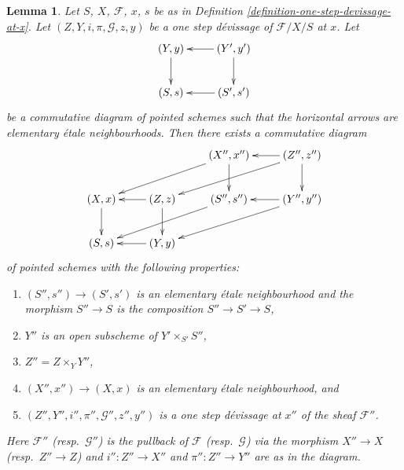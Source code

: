 \documentclass[10pt,a4paper]{amsart}
\theoremstyle{plain}
\newtheorem{lemma}[subsection]{Lemma}
\theoremstyle{definition}
\theoremstyle{remark}
\numberwithin{equation}{subsection}
\begin{document}
\begin{lemma}
\label{lemma-elementary-etale-neighbourhood}
Let $S$, $X$, $\mathcal{F}$, $x$, $s$ be as in
Definition \ref{definition-one-step-devissage-at-x}.
Let $(Z, Y, i, \pi, \mathcal{G}, z, y)$ be a one step d\'evissage
of $\mathcal{F}/X/S$ at $x$. Let
$$
\xymatrix{
(Y, y) \ar[d] & (Y', y') \ar[l] \ar[d] \\
(S, s) & (S', s') \ar[l]
}
$$
be a commutative diagram of pointed schemes such that the horizontal
arrows are elementary \'etale neighbourhoods. Then there exists
a commutative diagram
$$
\xymatrix{
& & (X'', x'') \ar[lld] \ar[d] & (Z'', z'') \ar[l] \ar[lld] \ar[d] \\
(X, x) \ar[d] & (Z, z) \ar[l] \ar[d] &
(S'', s'') \ar[lld] & (Y'', y'') \ar[lld] \ar[l] \\
(S, s) & (Y, y) \ar[l]
}
$$
of pointed schemes with the following properties:
\begin{enumerate}
\item $(S'', s'') \to (S', s')$ is an elementary \'etale neighbourhood and
the morphism $S'' \to S$ is the composition $S'' \to S' \to S$,
\item $Y''$ is an open subscheme of $Y' \times_{S'} S''$,
\item $Z'' = Z \times_Y Y''$,
\item $(X'', x'') \to (X, x)$ is an elementary \'etale neighbourhood, and
\item $(Z'', Y'', i'', \pi'', \mathcal{G}'', z'', y'')$ is a one step
d\'evissage at $x''$ of the sheaf $\mathcal{F}''$.
\end{enumerate}
Here $\mathcal{F}''$ (resp.\ $\mathcal{G}''$) is the pullback of
$\mathcal{F}$ (resp.\ $\mathcal{G}$) via the morphism $X'' \to X$
(resp.\ $Z'' \to Z$) and $i'' : Z'' \to X''$ and $\pi'' : Z'' \to Y''$
are as in the diagram.
\end{lemma}
\end{document}
